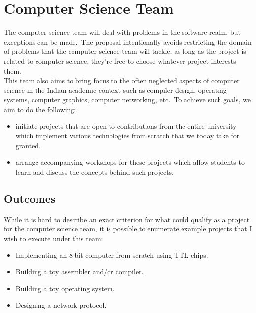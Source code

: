\section{Computer Science Team}\label{sec:computer-science-team}
The computer science team will deal with problems in the software realm, but exceptions can be made.\ The proposal
intentionally avoids restricting the domain of problems that the computer science team will tackle, as long as the
project is related to computer science, they're free to choose whatever project interests them.
\\
This team also aims to bring focus to the often neglected aspects of computer science in the Indian academic context
such as compiler design, operating systems, computer graphics, computer networking, etc.\ To achieve such goals, we aim
to do the following:

\begin{itemize}
    \item initiate projects that are open to contributions from the entire university which implement various
    technologies from scratch that we today take for granted.
    \item arrange accompanying workshops for these projects which allow students to learn and discuss the concepts
    behind such projects.
\end{itemize}


\subsection{Outcomes}\label{subsec:cst-outcomes}
While it is hard to describe an exact criterion for what could qualify as a project for the computer science team, it is
possible to enumerate example projects that I wish to execute under this team:

\begin{itemize}
    \item Implementing an 8-bit computer from scratch using TTL chips.
    \item Building a toy assembler and/or compiler.
    \item Building a toy operating system.
    \item Designing a network protocol.
\end{itemize}